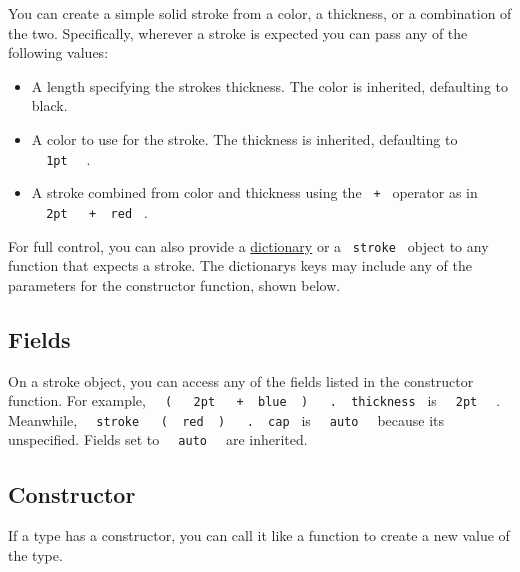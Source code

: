 You can create a simple solid stroke from a color, a thickness, or a
combination of the two. Specifically, wherever a stroke is expected you
can pass any of the following values:

\begin{itemize}
\tightlist
\item
  A length specifying the stroke\textquotesingle s thickness. The color
  is inherited, defaulting to black.
\item
  A color to use for the stroke. The thickness is inherited, defaulting
  to \texttt{\ }{\texttt{\ 1pt\ }}\texttt{\ } .
\item
  A stroke combined from color and thickness using the \texttt{\ +\ }
  operator as in
  \texttt{\ }{\texttt{\ 2pt\ }}\texttt{\ }{\texttt{\ +\ }}\texttt{\ red\ }
  .
\end{itemize}

For full control, you can also provide a
\href{/docs/reference/foundations/dictionary/}{dictionary} or a
\texttt{\ stroke\ } object to any function that expects a stroke. The
dictionary\textquotesingle s keys may include any of the parameters for
the constructor function, shown below.

\subsection{Fields}\label{fields}

On a stroke object, you can access any of the fields listed in the
constructor function. For example,
\texttt{\ }{\texttt{\ (\ }}\texttt{\ }{\texttt{\ 2pt\ }}\texttt{\ }{\texttt{\ +\ }}\texttt{\ blue\ }{\texttt{\ )\ }}\texttt{\ }{\texttt{\ .\ }}\texttt{\ thickness\ }
is \texttt{\ }{\texttt{\ 2pt\ }}\texttt{\ } . Meanwhile,
\texttt{\ }{\texttt{\ stroke\ }}\texttt{\ }{\texttt{\ (\ }}\texttt{\ red\ }{\texttt{\ )\ }}\texttt{\ }{\texttt{\ .\ }}\texttt{\ cap\ }
is \texttt{\ }{\texttt{\ auto\ }}\texttt{\ } because
it\textquotesingle s unspecified. Fields set to
\texttt{\ }{\texttt{\ auto\ }}\texttt{\ } are inherited.

\subsection{\texorpdfstring{Constructor
{}}{Constructor }}\label{constructor}

\label{constructor-constructor-tooltip}
If a type has a constructor, you can call it like a function to create a
new value of the type.

